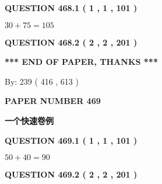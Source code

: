 \documentclass{ctexart}
\begin{document}
   
  
\vspace{0.2in}
  
{\textbf{\Large{QUESTION
468.1 
 ( 1 , 1 , 101 )
}}}
  
  
 
 

$ %
30 +  %
75=   %
105$
 
 
  
\vspace{0.2in}
  
{\textbf{\Large{QUESTION
468.2 
 ( 2 , 2 , 201 )
}}}
  
  
   
   
 \vspace{0.2in}
 
   
   
   
   
\vspace{1.0in} 
{\textbf{\large{ *** END OF PAPER, THANKS *** }}} 
   
   
\hspace{1.0in} By: 
 239 ( 416 ,  613 )
   
   
   
   
\newpage 
\setcounter{page}{ 
   469001 } 
   
   
   
   
 {\textbf{ \Large{ PAPER NUMBER  469  }}}
   
   
\vspace{0.2in}
   
   
   
   
   
   
 \vspace{0.2in}
{\LARGE {\textbf{ 一个快速卷例}}}
   
   
  
\vspace{0.2in}
  
{\textbf{\Large{QUESTION
469.1 
 ( 1 , 1 , 101 )
}}}
  
  
 
 

$ %
50 +  %
40=   %
90$
 
 
  
\vspace{0.2in}
  
{\textbf{\Large{QUESTION
469.2 
 ( 2 , 2 , 201 )
}}}
  
  
   
\end{document}
